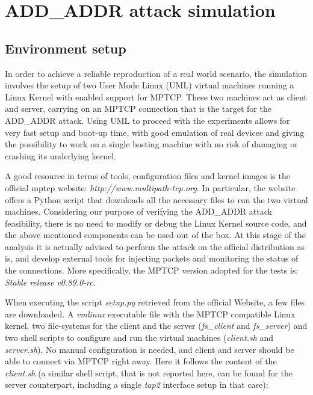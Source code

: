 \chapter{ADD\_ADDR attack simulation}
\label{chap:addaddrattackexecution}

\section{Environment setup}
\label{envsetup}
In order to achieve a reliable reproduction of a real world scenario, the simulation involves the setup of two User Mode Linux (UML) virtual machines running a Linux Kernel with enabled support for MPTCP. These two machines act as client and server, carrying on an MPTCP connection that is the target for the ADD\_ADDR attack. 
Using UML to proceed with the experiments allows for very fast setup and boot-up time, with good emulation of real devices and giving the possibility to work on a single hosting machine with no risk of damaging or crashing its underlying kernel.

A good resource in terms of tools, configuration files and kernel images is the official mptcp website:
\textit{http://www.multipath-tcp.org}. In particular, the website offers a Python script that downloads all the necessary files to run the two virtual machines. Considering our purpose of verifying the ADD\_ADDR attack feasibility, there is no need to modify or debug the Linux Kernel source code, and the above mentioned components can be used out of the box. At this stage of the analysis it is actually advised to perform the attack on the official distribution as is, and develop external tools for injecting packets and monitoring the status of the connections. More specifically, the MPTCP version adopted for the tests is: \textit{Stable release v0.89.0-rc}.

When executing the script \textit{setup.py} retrieved from the official Website, a few files are downloaded. A \textit{vmlinux} executable file with the MPTCP compatible Linux kernel, two file-systems for the client and the server (\textit{fs\_client} and \textit{fs\_server}) and two shell scripts to configure and run the virtual machines (\textit{client.sh} and \textit{server.sh}). No manual configuration is needed, and client and server should be able to connect via MPTCP right away.
Here it follows the content of the \textit{client.sh} (a similar shell script, that is not reported here, can be found for the server counterpart, including a single \textit{tap2} interface setup in that case):


